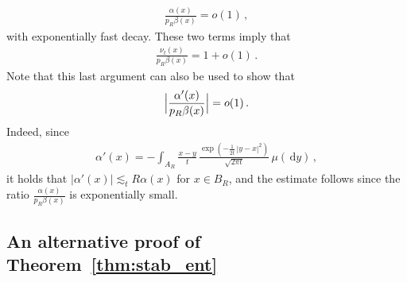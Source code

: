 \documentclass[12pt]{article}
\newcommand{\1}{\mathds{1}}
\newcommand*{\rd}{\mathrm{d}}
\newcommand*{\dd}{\, \rd}
\theoremstyle{plain}
\theoremstyle{definition}
\theoremstyle{remark}
\begin{document}
\begin{align*}
    \frac{\alpha(x)}{p_R \beta(x)} = o(1)\,,
\end{align*}
with exponentially fast decay. These two terms imply that 
\begin{align*}
    \frac{\nu_t(x)}{p_R\beta(x)} = 1 + o(1)\,.
\end{align*}
Note that this last argument can also be used to show that
\begin{align*}
    \Bigl|\frac{\alpha'(x)}{p_R\beta(x)}\Bigr| = o(1)\,.
\end{align*}
{Indeed, since
\begin{align*}
    \alpha'(x) = -\int_{A_R} \frac{x-y}{t}\,\frac{\exp(-\frac{1}{2t}\,|y-x|^2)}{\sqrt{2\pi t}}\,\mu(\!\dd y)\,,
\end{align*}
it holds that $|\alpha'(x)| \lesssim_t R\alpha(x)$ for $x\in B_R$, and the estimate follows since the ratio $\frac{\alpha(x)}{p_R\beta(x)}$ is exponentially small.
}


\subsection{An alternative proof of Theorem~\ref{thm:stab_ent}}\label{sec:proof_old}
\end{document}
